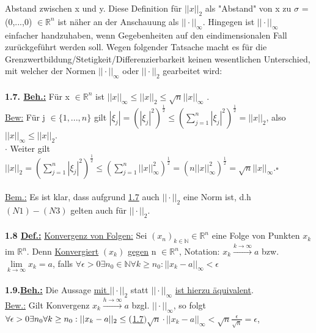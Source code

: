 \documentclass[11pt]{article}
\begin{document}
	Abstand zwischen x und y. Diese Definition für $||x||_2$ als "Abstand" von 
	x zu $\sigma$ =(0,...,0) $\in \mathbb{R}^n$ ist näher an der Anschauung als 
	$||\cdot||_\infty$. Hingegen ist $||\cdot||_\infty$ einfacher handzuhaben, 
	wenn Gegebenheiten auf den eindimensionalen Fall zurückgeführt werden soll.
	Wegen folgender Tatsache macht es für die 
	Grenzwertbildung/Stetigkeit/Differenzierbarkeit keinen wesentlichen 
	Unterschied, mit welcher der Normen $||\cdot||_\infty$ oder $ ||\cdot||_2$ 
	gearbeitet wird:\\\\
	\textbf{1.7. \underline{Beh.:}} Für x $\in \mathbb{R}^n$ ist 
	\ul{$||x||_\infty \leq ||x||_2 \leq \sqrt{n} ||x||_\infty$} .\\
	\underline{Bew:} Für j $\in \{1,...,n\}$ gilt 
	$|\xi_j|=(|\xi_j|^2)^{\frac{1}{2}}\leq(\sum_{j=1}^{n}|\xi_j|^2)^{\frac{1}{2}}
	=||x||_2$, also $||x||_\infty \leq ||x||_2$.\\
	$\cdot$ Weiter gilt $||x||_2 = (\sum_{j=1}^{n}|\xi_j|^2)^{\frac{1}{2}}\leq 
	(\sum_{j=1}^{n}||x||_\infty^2)^{\frac{1}{2}}= 
	(n||x||_\infty^2)^{\frac{1}{2}}=\sqrt{n}||x||_\infty.\square$\\\\
	\underline{Bem.:} Es ist klar, dass aufgrund  \ul{1.7} 
	auch $||\cdot||_2$ eine Norm ist, d.h $(N1)-(N3)$ gelten auch für 
	$||\cdot||_2$.\\
	\\
	\textbf{1.8 \underline{Def.:}} \ul{Konvergenz von Folgen:} 
	Sei 
	$(x_n)_{k\in \mathbb{N}} \in \mathbb{R}^n$ eine Folge von Punkten $x_k$ im 
	$\mathbb{R}^n$. Denn \ul{Konvergiert} $(x_k)$ \ul{gegen} n $\in 
	\mathbb{R}^n$, Notation: $x_k \xrightarrow{k \rightarrow \infty} a$ bzw. 
	$\underset{k \to \infty}{\lim} x_k = a$, falls $\forall \epsilon > 0 
	\exists n_0 \in \mathbb{N} \forall k \geq n_0 : ||x_k - a ||_\infty 
	<\epsilon$\\
	\\
	\textbf{1.9.\underline{Beh.:}} Die Aussage  \ul{mit 
	$||\cdot||_2$} 
	statt $||\cdot||_\infty$ \ul{ist hierzu äquivalent}.\\
	\underline{Bew.:} Gilt Konvergenz $x_k\xrightarrow{h\rightarrow\infty} a$ 
	bzgl. $||\cdot||_\infty$, so folgt\\
	$\forall\epsilon > 0 \exists n_0 \forall k \geq n_0: || x_k -a||_2 \leq 
	\setulcolor{blue} ($\ul{1.7}$) \sqrt{n} \cdot||x_k-a||_\infty < \sqrt{n} 
	\frac{\epsilon}{\sqrt{n}} = \epsilon$,\\
\end{document}
